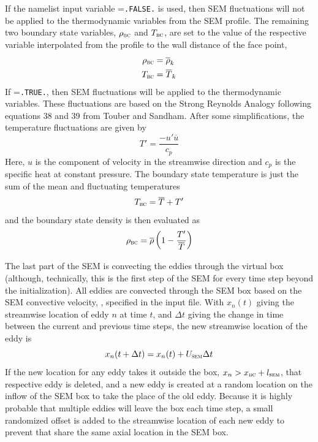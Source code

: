 If the namelist input variable
%
=\texttt{.FALSE.} is used, then
SEM fluctuations will not be applied to the thermodynamic variables from
the SEM profile.
%
The remaining two boundary state variables,
$\rho_{\textsc{bc}}$ and $T_{\textsc{bc}}$, are set to the
value of the respective variable interpolated from the profile to the wall
distance of the face point, \thatis
%
\begin{align*}
  \rho_{\textsc{bc}} & = \overline{\rho}_k \\
  T_{\textsc{bc}} & = \overline{T}_k
\end{align*}
%
If %
=\texttt{.TRUE.}, then
SEM fluctuations will be applied to the thermodynamic variables.
%
These fluctuations are based on the Strong Reynolds Analogy following
equations 38 and 39 from Touber and Sandham\cite{Touber_2008}.
%
After some simplifications, the temperature fluctuations are given by
\begin{equation*}
  T' = \frac{- u' \overline{u}}{c_p}
\end{equation*}
%
Here, $u$ is the component of velocity in the streamwise direction and $c_p$ is
the specific heat at constant pressure.
%
The boundary state temperature is just the sum of the mean and fluctuating
temperatures
%
\begin{equation*}
  T_{\textsc{bc}} = \overline{T} + T'
\end{equation*}
%
and the boundary state density is then evaluated as
%
\begin{equation*}
  \rho_{\textsc{bc}} = \overline{\rho}\left(1-\frac{T'}{\overline{T}}\right)
\end{equation*}


\label{SEC:SEM:theory:ConvectEddies}

The last part of the SEM is convecting the eddies through the virtual box
(although, technically, this is the first step of the SEM for every time step
beyond the initialization).
%
All eddies are convected through the SEM box based on the SEM
convective velocity, \uSEM, specified in the input file.
%
With $x_n (t)$ giving the streamwise location of eddy $n$ at time $t$,
and $\Delta t$ giving the change in time between the current and
previous time steps, the new streamwise location of the eddy is
%
\begin{equation*}
  x_n (t+\Delta t) = x_n (t) + U_{\textsc{sem}} \Delta t
\end{equation*}
%
If the new location for any eddy takes it outside the box, \thatis
$x_n>x_{\textsc{bc}}+l_{\textsc{sem}}$, that respective eddy is deleted, and a new eddy is created
at a random location on the inflow of the SEM box to take the place of the old
eddy.
%
Because it is highly probable that multiple eddies will leave the box each time
step, a small randomized offset is added to the streamwise location of each new
eddy to prevent  that share the same axial location in
the SEM box.


